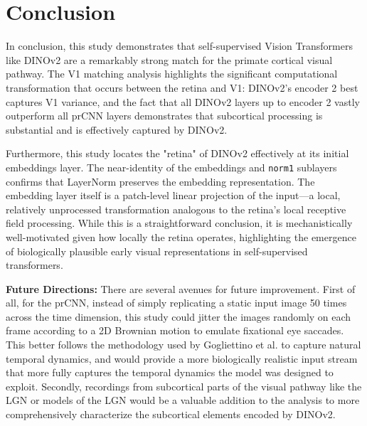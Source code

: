 \documentclass{article}
\begin{document}
\section{Conclusion}
In conclusion, this study demonstrates that self-supervised Vision
Transformers like DINOv2 are a remarkably strong match for the
primate cortical visual pathway. The V1 matching analysis highlights
the significant computational transformation that occurs between the
retina and V1: DINOv2's encoder 2 best captures V1 variance, and the
fact that all DINOv2 layers up to encoder 2 vastly outperform all
prCNN layers demonstrates that subcortical processing is
substantial and is effectively captured by DINOv2.

Furthermore, this study locates the "retina" of DINOv2 effectively at
its initial embeddings layer. The near-identity of the embeddings and
\texttt{norm1} sublayers confirms that LayerNorm preserves the
embedding representation. The embedding layer itself is a
patch-level linear projection of the input—a local, relatively
unprocessed transformation analogous to the retina's local receptive
field processing. While this is a straightforward conclusion, it is
mechanistically well-motivated given how locally the retina operates,
highlighting the emergence of biologically plausible early visual
representations in self-supervised transformers.

\textbf{Future Directions:}
There are several avenues for future improvement. First of all, for the prCNN,
instead of simply replicating a static input image 50 times across the time
dimension, this study could jitter the images randomly on each frame according to a 2D
Brownian motion to emulate fixational eye saccades. This better follows the
methodology used by Gogliettino et al. \cite{alex_retina_cnn} to capture
natural temporal dynamics, and would provide a more biologically realistic
input stream that more fully captures the temporal dynamics the model was
designed to exploit. 
Secondly, recordings from subcortical parts of the visual 
pathway like the LGN or models of the LGN would be a valuable 
addition to the analysis to more comprehensively characterize the subcortical 
elements encoded by DINOv2.

\newpage



\end{document}
